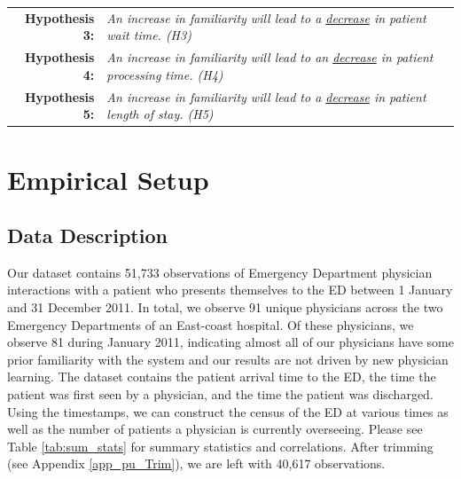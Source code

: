  \medskip \noindent
 \begin{tabularx}{\linewidth}{ r X }
    \textbf{Hypothesis 3:} & \textit{An increase in familiarity will lead to a \underline{decrease} in patient wait time. (H3)} \\
    \textbf{Hypothesis 4:} & \textit{An increase in familiarity will lead to an \underline{decrease} in patient processing time. (H4)} \\
    \textbf{Hypothesis 5:} & \textit{An increase in familiarity will lead to a \underline{decrease} in patient length of stay. (H5)} \\
 \end{tabularx}    %
 

\section{Empirical Setup} \label{Emp_PU}
 \subsection{Data Description}
 Our dataset contains 51,733 observations of Emergency Department physician interactions with a patient who presents themselves to the ED between 1 January and 31 December 2011. In total, we observe 91 unique physicians across the two Emergency Departments of an East-coast hospital. Of these physicians, we observe 81 during January 2011, indicating almost all of our physicians have some prior familiarity with the system and our results are not driven by new physician learning. The dataset contains the patient arrival time to the ED, the time the patient was first seen by a physician, and the time the patient was discharged. Using the timestamps, we can construct the census of the ED at various times as well as the number of patients a physician is currently overseeing. Please see Table \ref{tab:sum_stats} for summary statistics and correlations. After trimming (see Appendix \ref{app_pu_Trim}), we are left with 40,617 observations. 
  
